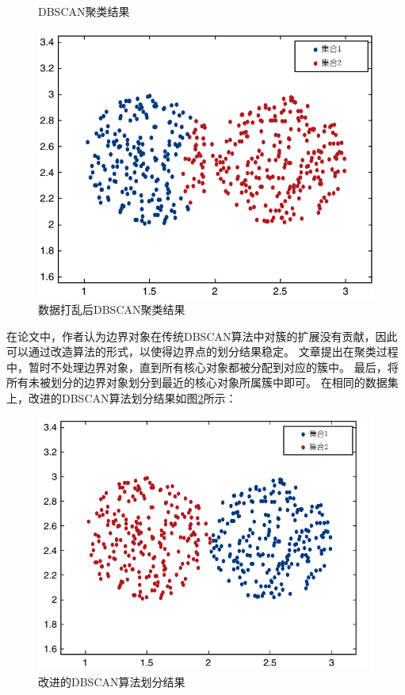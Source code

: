 \begin{figure}[htbp]
\begin{minipage}[t]{0.3\linewidth}
		\caption{DBSCAN聚类结果}
		\label{s4-img-f2}
	\end{minipage}
	\hfill%
	\begin{minipage}[t]{0.3\linewidth}
		\includegraphics[width=\linewidth]{img/expr3.png}
		\caption{数据打乱后DBSCAN聚类结果}
		\label{s4-img-f3}
	\end{minipage}
\end{figure}

在论文\cite{tran2013revised}中，作者认为边界对象在传统DBSCAN算法中对簇的扩展没有贡献，因此可以通过改造算法的形式，以使得边界点的划分结果稳定。
文章提出在聚类过程中，暂时不处理边界对象，直到所有核心对象都被分配到对应的簇中。
最后，将所有未被划分的边界对象划分到最近的核心对象所属簇中即可。
在相同的数据集上，改进的DBSCAN算法划分结果如图\ref{s4-reDBSCANimg}所示：

\begin{figure}[htbp] %
	\centering
	\includegraphics[scale=0.2]{img/expres.png}
	\caption{改进的DBSCAN算法划分结果}
	\label{s4-reDBSCANimg}
\end{figure}

